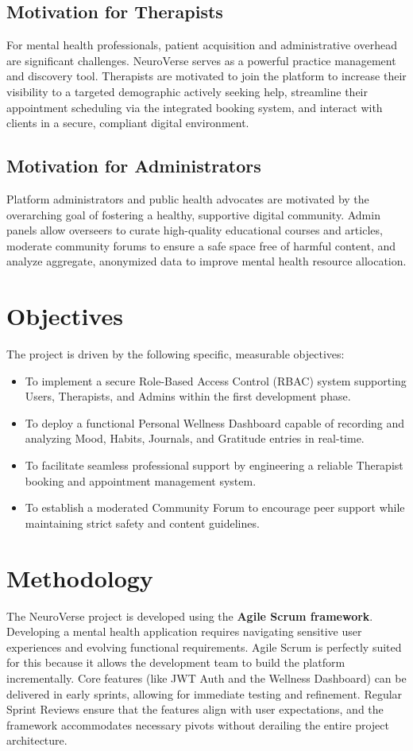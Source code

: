 \documentclass[a4paper,11pt]{report}
\begin{document}
\subsection{Motivation for Therapists}
For mental health professionals, patient acquisition and administrative overhead are significant challenges. NeuroVerse serves as a powerful practice management and discovery tool. Therapists are motivated to join the platform to increase their visibility to a targeted demographic actively seeking help, streamline their appointment scheduling via the integrated booking system, and interact with clients in a secure, compliant digital environment.

\subsection{Motivation for Administrators}
Platform administrators and public health advocates are motivated by the overarching goal of fostering a healthy, supportive digital community. Admin panels allow overseers to curate high-quality educational courses and articles, moderate community forums to ensure a safe space free of harmful content, and analyze aggregate, anonymized data to improve mental health resource allocation.

\section{Objectives}
The project is driven by the following specific, measurable objectives:
\begin{itemize}
    \item To implement a secure Role-Based Access Control (RBAC) system supporting Users, Therapists, and Admins within the first development phase.
    \item To deploy a functional Personal Wellness Dashboard capable of recording and analyzing Mood, Habits, Journals, and Gratitude entries in real-time.
    \item To facilitate seamless professional support by engineering a reliable Therapist booking and appointment management system.
    \item To establish a moderated Community Forum to encourage peer support while maintaining strict safety and content guidelines.
\end{itemize}

\section{Methodology}
The NeuroVerse project is developed using the \textbf{Agile Scrum framework}. Developing a mental health application requires navigating sensitive user experiences and evolving functional requirements. Agile Scrum is perfectly suited for this because it allows the development team to build the platform incrementally. Core features (like JWT Auth and the Wellness Dashboard) can be delivered in early sprints, allowing for immediate testing and refinement. Regular Sprint Reviews ensure that the features align with user expectations, and the framework accommodates necessary pivots without derailing the entire project architecture.
\end{document}
